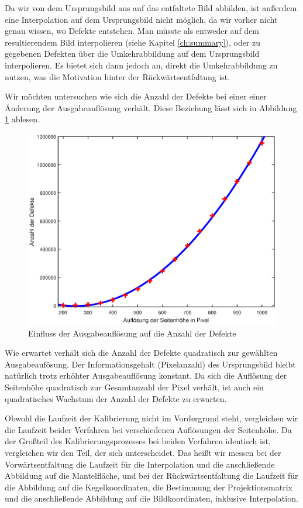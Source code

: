 Da wir von dem Ursprungsbild aus auf das entfaltete Bild abbilden, ist außerdem eine Interpolation auf dem Ursprungsbild nicht möglich, da wir vorher nicht genau wissen, wo Defekte entstehen. Man müsste als entweder auf dem resultierendem Bild interpolieren (siehe Kapitel \ref{ch:summary}), oder zu gegebenen Defekten über die Umkehrabbildung auf dem Ursprungsbild interpolieren. 
Es bietet sich dann jedoch an, direkt die Umkehrabbildung zu nutzen, was die Motivation hinter der Rückwärtsentfaltung ist.

Wir möchten untersuchen wie sich die Anzahl der Defekte bei einer einer Änderung der Ausgabeauflösung verhält. Diese Beziehung lässt sich in Abbildung \ref{fig:influenceRes} ablesen. 
\begin{figure}[!htb]
	\centering
	\includegraphics[width=\textwidth]{images/numberOfHoles.eps}
	\caption{Einfluss der Ausgabeauflösung auf die Anzahl der Defekte}
	\label{fig:influenceRes}
\end{figure}

Wie erwartet verhält sich die Anzahl der Defekte quadratisch zur gewählten Ausgabeaufösung. Der Informationsgehalt (Pixelanzahl) des Ursprungsbild bleibt natürlich trotz erhöhter Ausgabeauflösung konstant. Da sich die Auflösung der Seitenhöhe quadratisch zur Gesamtanzahl der Pixel verhält, ist auch ein quadratisches Wachstum der Anzahl der Defekte zu erwarten. 

Obwohl die Laufzeit der Kalibrierung nicht im Vordergrund steht, vergleichen wir die Laufzeit beider Verfahren bei verschiedenen Auflösungen der Seitenhöhe. Da der Großteil des Kalibrierungsprozesses bei beiden Verfahren identisch ist, vergleichen wir den Teil, der sich unterscheidet. Das heißt wir messen bei der Vorwärtsentfaltung die Laufzeit für die Interpolation und die anschließende Abbildung auf die Mantelfläche, und bei der Rückwärtsentfaltung die Laufzeit für die Abbildung auf die Kegelkoordinaten, die Bestimmung der Projektionsmatrix und die anschließende Abbildung auf die Bildkoordinaten, inklusive Interpolation.


